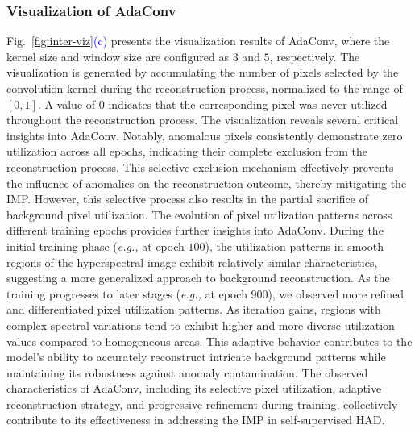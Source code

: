 \subsubsection{Visualization of AdaConv}
Fig.~\ref{fig:inter-viz}\textcolor{blue}{(c)} presents the visualization results of AdaConv, where the kernel size and window size are configured as $3$ and $5$, respectively. The visualization is generated by accumulating the number of pixels selected by the convolution kernel during the reconstruction process, normalized to the range of $[0,1]$. A value of $0$ indicates that the corresponding pixel was never utilized throughout the reconstruction process. The visualization reveals several critical insights into AdaConv. Notably, anomalous pixels consistently demonstrate zero utilization across all epochs, indicating their complete exclusion from the reconstruction process. This selective exclusion mechanism effectively prevents the influence of anomalies on the reconstruction outcome, thereby mitigating the IMP. However, this selective process also results in the partial sacrifice of background pixel utilization. The evolution of pixel utilization patterns across different training epochs provides further insights into AdaConv. During the initial training phase (\textit{e.g.,} at epoch $100$), the utilization patterns in smooth regions of the hyperspectral image exhibit relatively similar characteristics, suggesting a more generalized approach to background reconstruction. As the training progresses to later stages (\textit{e.g.,} at epoch $900$), we observed more refined and differentiated pixel utilization patterns. As iteration gains, regions with complex spectral variations tend to exhibit higher and more diverse utilization values compared to homogeneous areas. This adaptive behavior contributes to the model's ability to accurately reconstruct intricate background patterns while maintaining its robustness against anomaly contamination. The observed characteristics of AdaConv, including its selective pixel utilization, adaptive reconstruction strategy, and progressive refinement during training, collectively contribute to its effectiveness in addressing the IMP in self-supervised HAD.




